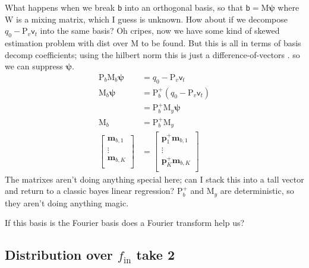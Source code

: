 \documentclass{article}
\newcommand{\vv}[1]{\boldsymbol{#1}}
\newcommand{\mm}[1]{\mathrm{#1}}
\newcommand{\rv}[1]{\mathsf{#1}}
\newcommand{\lat}{\rv{b}}   %
\newcommand{\latst}{b}      %
\begin{document}
What happens when we break \(\lat\) into an orthogonal basis, so that \(\lat=\mm{M}\vv{\psi}\) where \(\mm{W}\) is a mixing matrix, which I guess is unknown.
How about if we decompose \(q_0 - \mm{P}_{v}\rv{v}_{t}\) into the same basis?
Oh cripes, now we have some kind of skewed estimation problem with dist over \(\mm{M}\) to be found.
But this is all in terms of basis decomp coefficients; using the hilbert norm this is just a difference-of-vectors .
so we can suppress \(\vv{\psi}\).
\begin{align}
    \mm{P}_{\latst}\mm{M}_{\latst}\vv{\psi}&= q_0 - \mm{P}_{v}\rv{v}_{t}\\
    \mm{M}_{\latst}\vv{\psi}&=\mm{P}_{\latst}^{+}(q_0 - \mm{P}_{v}\rv{v}_{t})\\
    &=\mm{P}_{\latst}^{+}\mm{M}_{y}\vv{\psi}\\
    \mm{M}_{\latst}&=\mm{P}_{\latst}^{+}\mm{M}_{y}\\
    \begin{bmatrix}
        \vv{m}_{\latst,1}\\
        \vdots\\
        \vv{m}_{\latst,K}\\
    \end{bmatrix}&=\begin{bmatrix}
        \vv{p}^{+}_1\vv{m}_{\latst,1}\\
        \vdots\\
        \vv{p}^{+}_K\vv{m}_{\latst,K}\\
    \end{bmatrix}
\end{align}
The matrixes aren't doing anything special here; can I stack this into a tall vector and return to a classic bayes linear regression? \(\mm{P}_{\latst}^{+}\) and \(\mm{M}_{y}\) are deterministic, so they aren't doing anything magic.


If this basis is the Fourier basis does a Fourier transform help us?

\subsection{Distribution over $f_{\text{in}}$ take 2}
\end{document}
